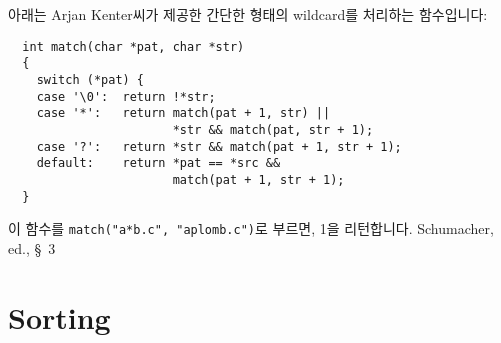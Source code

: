 \begin{faq}
        아래는 Arjan Kenter씨가 제공한 간단한 형태의 wildcard를 처리하는 
        함수입니다:
\begin{verbatim}
  int match(char *pat, char *str)
  {
    switch (*pat) {
    case '\0':  return !*str;
    case '*':   return match(pat + 1, str) ||
                       *str && match(pat, str + 1);
    case '?':   return *str && match(pat + 1, str + 1);
    default:    return *pat == *src && 
                       match(pat + 1, str + 1);
  }
\end{verbatim}
	\noindent 이 함수를 \verb+match("a*b.c", "aplomb.c")+로 부르면,
        1을 리턴합니다.
\R
	Schumacher, ed.,  \S\ 3 
\end{faq}

\section{Sorting}

